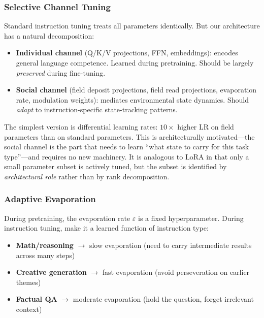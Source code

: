 \documentclass[11pt,a4paper]{article}
\begin{document}
\subsubsection{Selective Channel Tuning}

Standard instruction tuning treats all parameters identically.  But
our architecture has a natural decomposition:

\begin{itemize}
    \item \textbf{Individual channel} (Q/K/V projections, FFN,
          embeddings): encodes general language competence.  Learned
          during pretraining.  Should be largely \emph{preserved}
          during fine-tuning.
    \item \textbf{Social channel} (field deposit projections, field
          read projections, evaporation rate, modulation weights):
          mediates environmental state dynamics.  Should \emph{adapt}
          to instruction-specific state-tracking patterns.
\end{itemize}

The simplest version is differential learning rates: $10\times$ higher
LR on field parameters than on standard parameters.  This is
architecturally motivated---the social channel is the part that needs
to learn ``what state to carry for this task type''---and requires no
new machinery.  It is analogous to LoRA in that only a small parameter
subset is actively tuned, but the subset is identified by
\emph{architectural role} rather than by rank decomposition.

\subsubsection{Adaptive Evaporation}

During pretraining, the evaporation rate $\varepsilon$ is a fixed
hyperparameter.  During instruction tuning, make it a learned function
of instruction type:

\begin{itemize}
    \item \textbf{Math/reasoning} $\rightarrow$ slow evaporation
          (need to carry intermediate results across many steps)
    \item \textbf{Creative generation} $\rightarrow$ fast evaporation
          (avoid perseveration on earlier themes)
    \item \textbf{Factual QA} $\rightarrow$ moderate evaporation
          (hold the question, forget irrelevant context)
\end{itemize}
\end{document}
